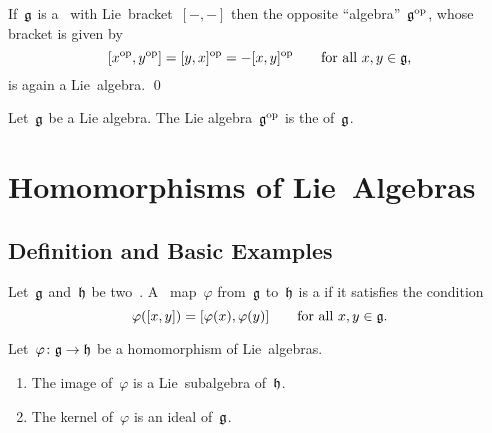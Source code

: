 \begin{proposition}
  If~$\mathfrak{g}$ is a~\liealgebra{$\kf$} with Lie~bracket~$[-,-]$ then the opposite \enquote{algebra}~$\mathfrak{g}^{\mathrm{op}}$, whose bracket is given by
  \[
    [x^{\mathrm{op}}, y^{\mathrm{op}}]
    =
    [y,x]^{\mathrm{op}}
    =
    -[x,y]^{\mathrm{op}}
    \qquad
    \text{for all~$x, y \in \mathfrak{g}$,}
  \]
  is again a Lie~algebra.
  \qed
\end{proposition}


\begin{definition}
  Let~$\mathfrak{g}$ be a Lie algebra.
  The Lie algebra~$\mathfrak{g}^{\mathrm{op}}$ is the  of~$\mathfrak{g}$.
\end{definition}





\section{Homomorphisms of Lie~Algebras}



\subsection{Definition and Basic Examples}


\begin{definition}
  Let~$\mathfrak{g}$ and~$\mathfrak{h}$ be two~\liealgebras{$\kf$}.
  A~\linear{$\kf$} map~$\varphi$ from~$\mathfrak{g}$ to~$\mathfrak{h}$ is a  if it satisfies the condition
 \[
   \varphi([x,y])
   =
   [\varphi(x), \varphi(y)]
   \qquad
   \text{for all~$x, y \in \mathfrak{g}$.}
 \]
\end{definition}


\begin{proposition}
  Let~$\varphi \colon \glie \to \hlie$ be a homomorphism of Lie~algebras.
  \begin{enumerate}
    \item
      The image of~$\varphi$ is a Lie~subalgebra of~$\mathfrak{h}$.
    \item
      The kernel of~$\varphi$ is an ideal of~$\mathfrak{g}$.
  \end{enumerate}
\end{proposition}


